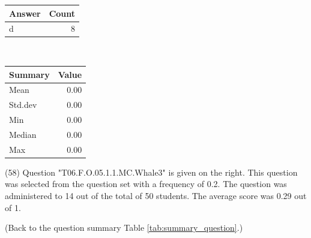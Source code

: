 \documentclass[12pt,english,nohyper]{tufte-handout}\usepackage[]{graphicx}\usepackage[]{color}
\begin{document}
\begin{center}%
\begin{tabular}{lr}
  \hline
Answer & Count \\ 
  \hline
d &   8 \\ 
   \hline
\end{tabular}
~~~~~~~~%
\begin{tabular}{lr}
  \hline
Summary & Value \\ 
  \hline
Mean & 0.00 \\ 
  Std.dev & 0.00 \\ 
  Min & 0.00 \\ 
  Median & 0.00 \\ 
  Max & 0.00 \\ 
   \hline
\end{tabular}
\end{center}\newpage{} (58) Question "T06.F.O.05.1.1.MC.Whale3" is given on the right. This question was selected from the question set with a frequency of 0.2. The question was administered to 14 out of the total of 50 students. The average score was 0.29 out of 1.

 (Back to the question summary Table \ref{tab:summary_question}.)
\end{document}
